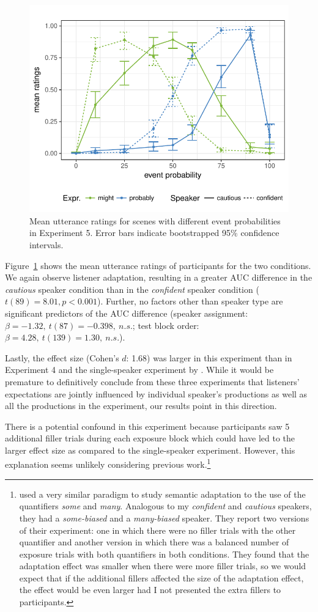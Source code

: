 \begin{figure}
\center
\includegraphics[width=0.5\columnwidth]{plots/exp2-results.pdf}
\caption{Mean utterance ratings for scenes with different event probabilities in Experiment 5. Error bars indicate bootstrapped 95\% confidence intervals. \label{fig:exp2-results}}
\end{figure}

Figure~\ref{fig:exp2-results} shows the mean utterance ratings of participants for the two conditions. We again observe listener adaptation, resulting in a greater AUC difference in the \emph{cautious} speaker 
condition than in the \emph{confident} speaker condition ($t(89)=8.01, p < 0.001$). Further, no factors
other than speaker type are significant predictors of the AUC difference 
(speaker assignment: $\beta=-1.32, \ t(87)=-0.398, \ n.s.$; test block order:  $\beta=4.28, \ t(139)=1.30, \ n.s.$).

Lastly, the effect size (Cohen's $d$: 1.68) was larger in this experiment than in Experiment 4 and the single-speaker 
experiment by \cite{Schuster2018}. While it would be premature to definitively conclude from these three experiments that listeners' expectations are jointly influenced
by individual speaker's productions as well as all the productions in the experiment, our results point in this direction. 

There is a potential confound in this experiment because participants saw 5 additional filler trials during each exposure block which could have led to the larger effect size as compared
to the single-speaker experiment. However, this explanation seems unlikely considering previous work.\footnote{\textcite{Yildirim2016} used 
a very similar paradigm to study semantic adaptation to the use of the quantifiers \textit{some} and \textit{many}. Analogous to my \textit{confident} and 
\textit{cautious} speakers, they had a \textit{some-biased} and a \textit{many-biased} speaker. They report two versions of their experiment: one in which
there were no filler trials with the other quantifier and another version in which there was a balanced number of exposure trials with both quantifiers in both conditions. They found that the adaptation effect was smaller when there were more filler trials, so we would expect that if the additional fillers affected the size of the adaptation effect, the effect would be even larger had I not presented the extra fillers to participants.}


